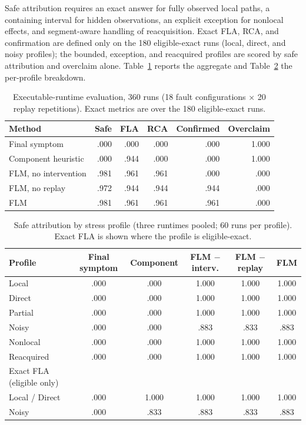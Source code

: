 \documentclass[10pt]{article}
\begin{document}
Safe attribution requires an exact answer for fully observed local paths, a containing interval for hidden observations, an explicit exception for nonlocal effects, and segment-aware handling of reacquisition. Exact FLA, RCA, and confirmation are defined only on the 180 eligible-exact runs (local, direct, and noisy profiles); the bounded, exception, and reacquired profiles are scored by safe attribution and overclaim alone. Table~\ref{tab:runtime} reports the aggregate and Table~\ref{tab:runtime-profiles} the per-profile breakdown.

\begin{table}[t]
\centering
\caption{Executable-runtime evaluation, 360 runs (18 fault configurations $\times$ 20 replay repetitions). Exact metrics are over the 180 eligible-exact runs.}
\label{tab:runtime}
\begin{tabular}{lrrrrr}
\toprule
Method & Safe & FLA & RCA & Confirmed & Overclaim \\
\midrule
Final symptom & .000 & .000 & .000 & .000 & 1.000 \\
Component heuristic & .000 & .944 & .000 & .000 & 1.000 \\
FLM, no intervention & .981 & .961 & .961 & .000 & .000 \\
FLM, no replay & .972 & .944 & .944 & .944 & .000 \\
FLM & .981 & .961 & .961 & .961 & .000 \\
\bottomrule
\end{tabular}
\end{table}

\begin{table}[t]
\centering
\caption{Safe attribution by stress profile (three runtimes pooled; 60 runs per profile). Exact FLA is shown where the profile is eligible-exact.}
\label{tab:runtime-profiles}
\begin{tabular}{lccccc}
\toprule
Profile & Final symptom & Component & FLM $-$interv. & FLM $-$replay & FLM \\
\midrule
Local & .000 & .000 & 1.000 & 1.000 & 1.000 \\
Direct & .000 & .000 & 1.000 & 1.000 & 1.000 \\
Partial & .000 & .000 & 1.000 & 1.000 & 1.000 \\
Noisy & .000 & .000 & .883 & .833 & .883 \\
Nonlocal & .000 & .000 & 1.000 & 1.000 & 1.000 \\
Reacquired & .000 & .000 & 1.000 & 1.000 & 1.000 \\
\midrule
Exact FLA (eligible only) & & & & & \\
\quad Local / Direct & .000 & 1.000 & 1.000 & 1.000 & 1.000 \\
\quad Noisy & .000 & .833 & .883 & .833 & .883 \\
\bottomrule
\end{tabular}
\end{table}
\end{document}
